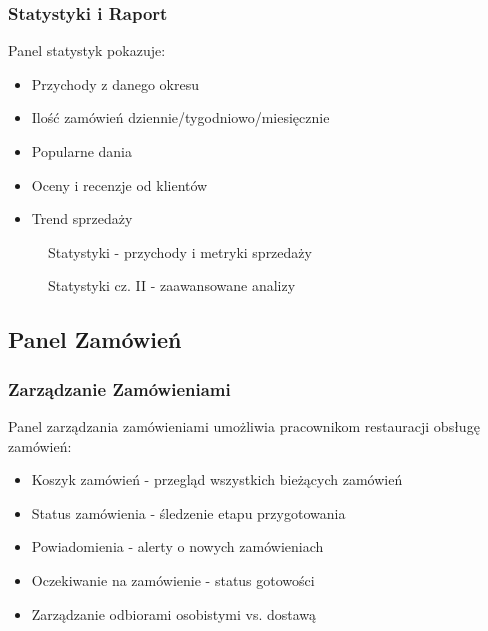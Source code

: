 \documentclass[12pt,a4paper,utf-8]{article}
\begin{document}
\subsubsection{Statystyki i Raport}

Panel statystyk pokazuje:

\begin{itemize}
    \item Przychody z danego okresu
    \item Ilość zamówień dziennie/tygodniowo/miesięcznie
    \item Popularne dania
    \item Oceny i recenzje od klientów
    \item Trend sprzedaży
\end{itemize}

\begin{figure}[H]
    \centering
    \caption{Statystyki  -  przychody i metryki sprzedaży}
    \label{fig:statistics}
\end{figure}

\begin{figure}[H]
    \centering
    \caption{Statystyki cz. II  -  zaawansowane analizy}
    \label{fig:statistics_2}
\end{figure}

\subsection{Panel Zamówień}

\subsubsection{Zarządzanie Zamówieniami}

Panel zarządzania zamówieniami umożliwia pracownikom restauracji obsługę zamówień:

\begin{itemize}
    \item Koszyk zamówień  -  przegląd wszystkich bieżących zamówień
    \item Status zamówienia  -  śledzenie etapu przygotowania
    \item Powiadomienia  -  alerty o nowych zamówieniach
    \item Oczekiwanie na zamówienie  -  status gotowości
    \item Zarządzanie odbiorami osobistymi vs. dostawą
\end{itemize}
\end{document}
